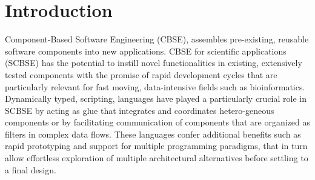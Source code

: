 \documentclass[10pt]{article}
\begin{document}
\section{Introduction}
Component-Based Software Engineering (CBSE), assembles pre-existing, reusable software components into new applications. CBSE for scientific applications (SCBSE) has the potential to instill novel functionalities in existing, extensively tested components with the promise of rapid development cycles that are particularly relevant for fast moving, data-intensive fields such as bioinformatics. Dynamically typed, scripting, languages have played a particularly crucial role in SCBSE by acting as glue that integrates and coordinates hetero-geneous components or by facilitating communication of components that are organized as filters in complex data flows. These languages confer additional benefits such as rapid prototyping and support for multiple programming paradigms, that in turn allow effortless exploration of multiple architectural alternatives before settling to a final design. 
\end{document}
